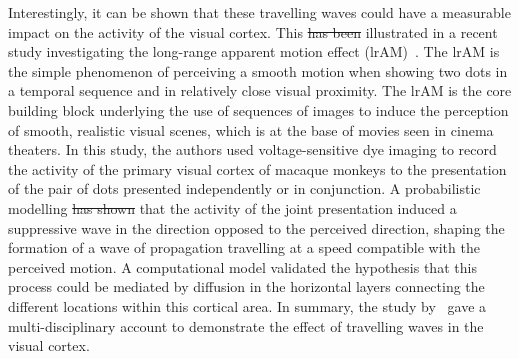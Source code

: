 \documentclass[brainsci, %
               review,accept,pdftex,moreauthors %
               ]{Definitions/mdpi}
\providecommand{\DIFadd}[1]{{\protect\color{blue}\uwave{#1}}} %
\providecommand{\DIFdel}[1]{{\protect\color{red}\sout{#1}}}                      %
\providecommand{\DIFaddbegin}{} %
\providecommand{\DIFaddend}{} %
\providecommand{\DIFdelbegin}{} %
\providecommand{\DIFdelend}{} %
\newcommand{\DIFscaledelfig}{0.5}
\newlength{\DIFdelgraphicswidth} %
\newlength{\DIFdelgraphicsheight} %
\newcommand{\DIFaddincludegraphics}[2][]{{\color{blue}\fbox{\DIFOincludegraphics[#1]{#2}}}} %
\newcommand{\DIFdelincludegraphics}[2][]{%
\sbox{\DIFdelgraphicsbox}{\DIFOincludegraphics[#1]{#2}}%
\settoboxwidth{\DIFdelgraphicswidth}{\DIFdelgraphicsbox} %
\settoboxtotalheight{\DIFdelgraphicsheight}{\DIFdelgraphicsbox} %
\scalebox{\DIFscaledelfig}{%
\parbox[b]{\DIFdelgraphicswidth}{\usebox{\DIFdelgraphicsbox}\\[-\baselineskip] \rule{\DIFdelgraphicswidth}{0em}}\llap{\resizebox{\DIFdelgraphicswidth}{\DIFdelgraphicsheight}{%
\setlength{\unitlength}{\DIFdelgraphicswidth}%
\begin{picture}(1,1)%
\thicklines\linethickness{2pt} %
{\color[rgb]{1,0,0}\put(0,0){\framebox(1,1){}}}%
{\color[rgb]{1,0,0}\put(0,0){\line( 1,1){1}}}%
{\color[rgb]{1,0,0}\put(0,1){\line(1,-1){1}}}%
\end{picture}%
}\hspace*{3pt}}} %
} %
\DeclareRobustCommand{\DIFaddbegin}{\DIFOaddbegin \let\includegraphics\DIFaddincludegraphics} %
\DeclareRobustCommand{\DIFaddend}{\DIFOaddend \let\includegraphics\DIFOincludegraphics} %
\DeclareRobustCommand{\DIFdelbegin}{\DIFOdelbegin \let\includegraphics\DIFdelincludegraphics} %
\DeclareRobustCommand{\DIFdelend}{\DIFOaddend \let\includegraphics\DIFOincludegraphics} %
\begin{document}
Interestingly, it can be shown that these travelling waves could have a measurable impact on the activity of the visual cortex. This \DIFdelbegin \DIFdel{has been }\DIFdelend \DIFaddbegin \DIFadd{was }\DIFaddend illustrated in a recent study investigating the long-range apparent motion effect (lrAM)~\citep{chemla_suppressive_2019}. The lrAM is the simple phenomenon of perceiving a smooth motion when showing two dots in a temporal sequence and in relatively close visual proximity. The lrAM is the core building block underlying the use of sequences of images to induce the perception of smooth, realistic visual scenes, which is at the base of movies seen in cinema theaters. In this study, the authors used voltage-sensitive dye imaging to record the activity of the primary visual cortex of macaque monkeys to the presentation of the pair of dots presented independently or in conjunction. A probabilistic modelling \DIFdelbegin \DIFdel{has shown }\DIFdelend \DIFaddbegin \DIFadd{showed }\DIFaddend that the activity of the joint presentation induced a suppressive wave in the direction opposed to the perceived direction, shaping the formation of a wave of propagation travelling at a speed compatible with the perceived motion. A computational model validated the hypothesis that this process could be mediated by diffusion in the horizontal layers connecting the different locations within this cortical area. In summary, the study by~\citet{chemla_suppressive_2019} gave a multi-disciplinary account to demonstrate the effect of travelling waves in the visual cortex.
%
%
\end{document}
